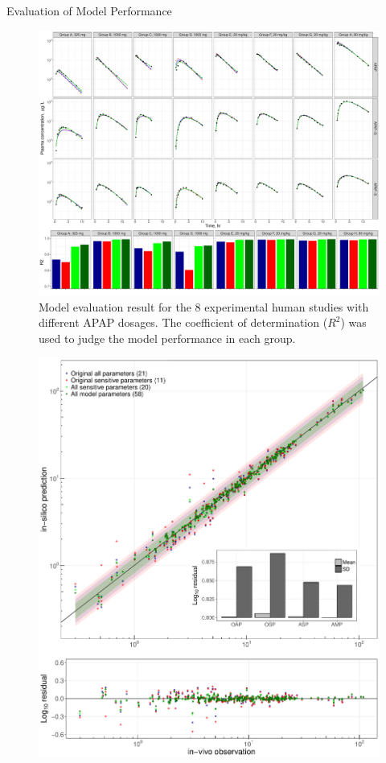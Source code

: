 \documentclass[xcolor=table]{beamer}
\begin{document}
\begin{frame}[t]
\begin{columns}[t]
\begin{column}{0.22\paperwidth} %
%
%
\begin{block}{Evaluation of Model Performance}
\begin{figure}
\includegraphics[width=\linewidth]{fig7.pdf}
\caption{Model evaluation result for the 8 experimental human studies with different APAP dosages. 
  The coefficient of determination ($R^2$) was used to judge the model performance in each group.
}
\end{figure}
\begin{figure}
\begin{columns}
\includegraphics[width=\textwidth]{fig8.pdf}

\end{columns}
\end{figure}
\end{block}
\end{column}
\end{columns}
\end{frame}
\end{document}
